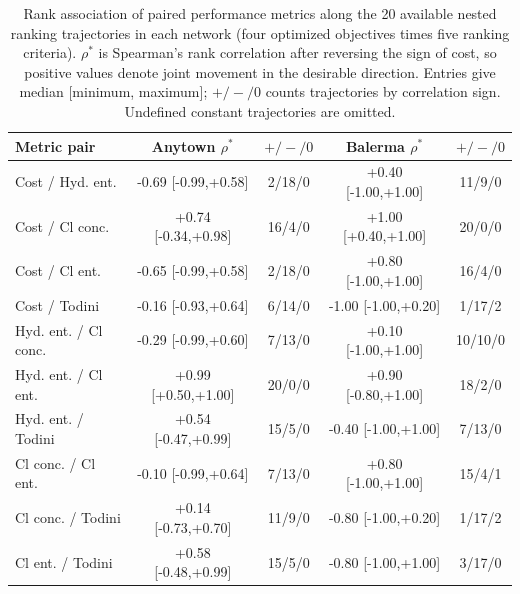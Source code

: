 \begin{table}[t]
\caption{Rank association of paired performance metrics along the 20 available nested ranking trajectories in each network (four optimized objectives times five ranking criteria). $\rho^*$ is Spearman's rank correlation after reversing the sign of cost, so positive values denote joint movement in the desirable direction. Entries give median [minimum, maximum]; $+/-/0$ counts trajectories by correlation sign. Undefined constant trajectories are omitted.}
\label{tab:ranking_metric_correlations}
\centering\scriptsize\renewcommand{\arraystretch}{1.08}
\begin{tabular}{lcccc}\toprule
Metric pair & Anytown $\rho^*$ & $+/-/0$ & Balerma $\rho^*$ & $+/-/0$ \\
\midrule
Cost / Hyd. ent. & -0.69 [-0.99,+0.58] & 2/18/0 & +0.40 [-1.00,+1.00] & 11/9/0 \\
Cost / Cl conc. & +0.74 [-0.34,+0.98] & 16/4/0 & +1.00 [+0.40,+1.00] & 20/0/0 \\
Cost / Cl ent. & -0.65 [-0.99,+0.58] & 2/18/0 & +0.80 [-1.00,+1.00] & 16/4/0 \\
Cost / Todini & -0.16 [-0.93,+0.64] & 6/14/0 & -1.00 [-1.00,+0.20] & 1/17/2 \\
Hyd. ent. / Cl conc. & -0.29 [-0.99,+0.60] & 7/13/0 & +0.10 [-1.00,+1.00] & 10/10/0 \\
Hyd. ent. / Cl ent. & +0.99 [+0.50,+1.00] & 20/0/0 & +0.90 [-0.80,+1.00] & 18/2/0 \\
Hyd. ent. / Todini & +0.54 [-0.47,+0.99] & 15/5/0 & -0.40 [-1.00,+1.00] & 7/13/0 \\
Cl conc. / Cl ent. & -0.10 [-0.99,+0.64] & 7/13/0 & +0.80 [-1.00,+1.00] & 15/4/1 \\
Cl conc. / Todini & +0.14 [-0.73,+0.70] & 11/9/0 & -0.80 [-1.00,+0.20] & 1/17/2 \\
Cl ent. / Todini & +0.58 [-0.48,+0.99] & 15/5/0 & -0.80 [-1.00,+1.00] & 3/17/0 \\
\bottomrule\end{tabular}
\end{table}
